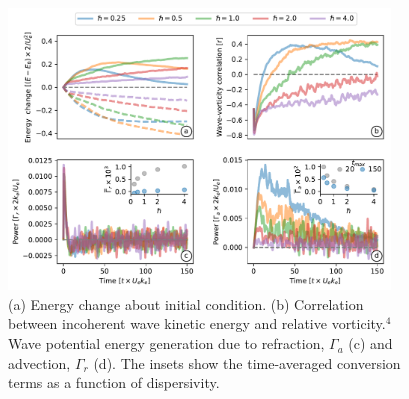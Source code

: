 \documentclass[final]{beamer}
\begin{document}
\begin{frame}[t]
\begin{columns}[t]
\begin{column}{0.55\textwidth}
\begin{columns}
\begin{column}{.475\textwidth}
                        \begin{figure}
                          \includegraphics[width=0.95\textwidth]{figs/hslash_dependence_turbulence.pdf}
                          \caption{(a) Energy change about initial condition.
                                  (b)  Correlation between
                                  incoherent wave
                                  kinetic energy and relative vorticity.$^4$ Wave potential
                                  energy generation
                                  due to refraction, $\Gamma_a$ (c) and advection, $\Gamma_r$ (d).
                                   The insets show the time-averaged conversion terms as a function
                                   of dispersivity.}
                        \end{figure}

                      \end{column}

                      \hspace{0.cm}

                      \begin{column}{0.475\textwidth}


\end{column}
\end{columns}
\end{column}
\end{columns}
\end{frame}
\end{document}
